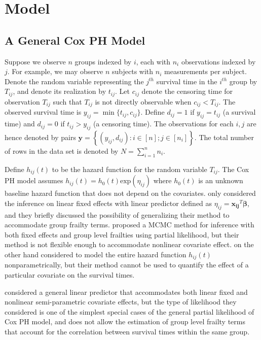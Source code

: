 \documentclass[ba]{imsart}
\begin{document}
\section{Model}\label{sec:model}

\subsection{A General Cox PH Model}

Suppose we observe $n$ groups indexed by $i$, each with $n_{i}$ observations indexed by $j$. For example, we may observe $n$ subjects with $n_{i}$ measurements per subject. Denote the random variable representing the $j^{th}$ survival time in the $i^{th}$ group by $T_{ij}$, and denote its realization by $t_{ij}$. Let $c_{ij}$ denote the censoring time for observation $T_{ij}$ such that $T_{ij}$ is not directly observable when $c_{ij} < T_{ij}$. The observed survival time is $y_{ij} = \min\{t_{ij},c_{ij}\}$. Define $d_{ij} = 1$ if $y_{ij} = t_{ij}$ (a survival time) and $d_{ij} = 0$ if $t_{ij} > y_{ij}$ (a censoring time). The observations for each $i,j$ are hence denoted by pairs $\boldsymbol{y} =  \left\{(y_{ij},d_{ij}): i\in[n]; j\in[n_{i}] \right\}$. The total number of rows in the data set is denoted by $N = \sum_{i=1}^{n}n_{i}$.

Define $h_{ij}(t)$ to be the hazard function for the random variable $T_{ij}$. The Cox PH model assumes $h_{ij}(t) = h_0(t)\text{exp}(\eta_{ij})$ where $h_0(t)$ is an unknown baseline hazard function that does not depend on the covariates. \cite{BayesianPartialMCMC} only considered the inference on linear fixed effects with linear predictor defined as $\eta_{ij} = \boldsymbol{x_{ij}}^T \boldsymbol{\beta}$, and they briefly discussed the possibility of generalizing their method to accommodate group frailty terms. \cite{PartialandFull2} proposed a MCMC method for inference with both fixed effects and group level frailties using partial likelihood, but their method is not flexible enough to accommodate nonlinear covariate effect.
\cite{BayesianNonpara} on the other hand considered to model the entire hazard function $h_{ij}(t)$ nonparametrically, but their method cannot be used to quantify the effect of a particular covariate on the survival times.

\cite{casecross} considered a general linear predictor that accommodates both linear fixed and nonlinear semi-parametric covariate effects, but the type of likelihood they considered is one of the simplest special cases of the general partial likelihood of Cox PH model, and does not allow the estimation of group level frailty terms that account for the correlation between survival times within the same group.
\end{document}

